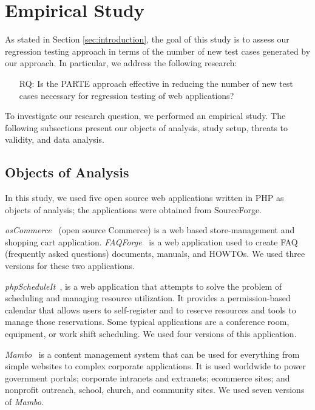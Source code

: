 \vspace*{4pt}
\section{Empirical Study}
\label{sec:study}

As stated in Section \ref{sec:introduction}, the goal of
this study is to assess our regression testing approach in terms 
of the number of new test cases generated by our approach.
In particular, we address the following research:

\begin{itemize}
\item[RQ:] Is the PARTE approach effective in reducing the
number of new test cases necessary for regression testing of
web applications? 
\end{itemize}

\noindent
To investigate our research question, we performed
an empirical study.
The following subsections present our objects of analysis, 
study setup, threats to validity, and data analysis.

\subsection{Objects of Analysis}
\label{sec:objects}

In this study, we used five open source web applications
written in PHP as objects of analysis; the applications
were obtained from SourceForge.

{\em osCommerce}~\cite{oscommerce} (open source Commerce) is 
a web based store-management and shopping cart application.
{\em FAQForge}~\cite{faqforge} is a web application used to 
create FAQ (frequently asked questions) documents, manuals,
and HOWTOs. We used three versions for these two applications. 

{\em phpScheduleIt}~\cite{phpscheduleit},
is a web application that attempts to solve the problem of
scheduling and managing resource utilization. It provides
a permission-based calendar that allows users to self-register
and to reserve resources and tools to manage those reservations.
Some typical applications are a conference room, equipment, or work
shift scheduling. We used four versions of this application. 

{\em Mambo}~\cite{mambo} is a content management
system that can be used for everything from simple websites to complex
corporate applications. It is used worldwide to power
government portals; corporate intranets and extranets; ecommerce sites;
and nonprofit outreach, school, church, and community sites. We used
seven versions of {\em Mambo}.

